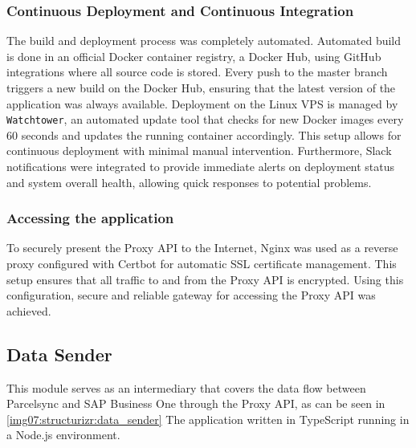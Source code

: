 \subsubsection{Continuous Deployment and Continuous Integration}
\label{subsubsec:cicd}
The build and deployment process was completely automated. 
Automated build is done in an official Docker container registry, a Docker Hub, using GitHub integrations where all source code is stored.
Every push to the master branch triggers a new build on the Docker Hub, ensuring that the latest version of the application was always available.
Deployment on the Linux VPS is managed by \texttt{Watchtower}, an automated update tool that checks for new Docker images every 60 seconds and updates the running container accordingly.
This setup allows for continuous deployment with minimal manual intervention.
Furthermore, Slack notifications were integrated to provide immediate alerts on deployment status and system overall health, allowing quick responses to potential problems.

\subsubsection{Accessing the application}
To securely present the Proxy API to the Internet, Nginx was used as a reverse proxy configured with Certbot for automatic SSL certificate management.
This setup ensures that all traffic to and from the Proxy API is encrypted.
Using this configuration, secure and reliable gateway for accessing the Proxy API was achieved.


\subsection{Data Sender}
\label{subsec:data-sender}

This module serves as an intermediary that covers the data flow between Parcelsync and SAP Business One through the Proxy API, as can be seen in \ref{img07:structurizr:data_sender}
The application written in TypeScript running in a Node.js environment.

